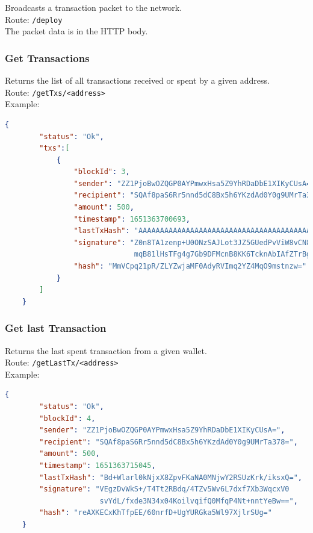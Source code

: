 \documentclass[../documentation.tex]{subfiles}
\begin{document}
Broadcasts a transaction packet to the network.
\\
Route: \texttt{/deploy}
\\
The packet data is in the HTTP body.

\subsubsection{Get Transactions}

Returns the list of all transactions received or spent by a given address.
\\
Route: \texttt{/getTxs/<address>}
\\
Example:
\begin{lstlisting}[language=json]
    {
        "status": "Ok",
        "txs":[
            {
                "blockId": 3,
                "sender": "ZZ1PjoBwOZQGP0AYPmwxHsa5Z9YhRDaDbE1XIKyCUsA=",
                "recipient": "SQAf8paS6Rr5nnd5dC8Bx5h6YKzdAd0Y0g9UMrTa378=",
                "amount": 500,
                "timestamp": 1651363700693,
                "lastTxHash": "AAAAAAAAAAAAAAAAAAAAAAAAAAAAAAAAAAAAAAAAAAA=",
                "signature": "Z0n8TA1zenp+U0ONzSAJLot3JZ5GUedPvViW8vCN8Q6hv
                              mqB81lHsTFg4g7Gb9DFMcnB8KK6TcknAbIAfZTrBg==",
                "hash": "MmVCpq21pR/ZLYZwjaMF0AdyRVImq2YZ4MqO9mstnzw="
            }
        ]
    }
\end{lstlisting}

\pagebreak

\subsubsection{Get last Transaction}

Returns the last spent transaction from a given wallet.
\\
Route: \texttt{/getLastTx/<address>}
\\
Example:
\begin{lstlisting}[language=json]
    {
        "status": "Ok",
        "blockId": 4,
        "sender": "ZZ1PjoBwOZQGP0AYPmwxHsa5Z9YhRDaDbE1XIKyCUsA=",
        "recipient": "SQAf8paS6Rr5nnd5dC8Bx5h6YKzdAd0Y0g9UMrTa378=",
        "amount": 500,
        "timestamp": 1651363715045,
        "lastTxHash": "Bd+Wlarl0kNjxX8ZpvFKaNA0MNjwY2RSUzKrk/iksxQ=",
        "signature": "VEgzDvWkS+/T4Tt2RBdq/4TZv5Wv6L7dxf7Xb3WqcxV0
                      svYdL/fxde3N34x04KoilvqifQ0MfqP4Nt+nntYeBw==",
        "hash": "reAXKECxKhTfpEE/60nrfD+UgYURGka5Wl97XjlrSUg="
    }
\end{lstlisting}
\end{document}
